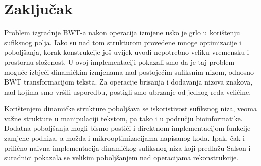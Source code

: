 \documentclass{ferseminar}
\begin{document}
\section{Zaključak}
Problem izgradnje BWT-a nakon operacija izmjene usko je grlo u korištenju sufiksnog polja. Iako su nad tom strukturom provedene mnoge optimizacije i poboljšanja, korak konstrukcije još uvijek uvodi nepotrebno veliku vremensku i prostornu složenost. U ovoj implementaciji pokazali smo da je taj problem moguće izbjeći dinamičkim izmjenama nad postojećim sufiksnim nizom, odnosno BWT transformacijom teksta. Za operacije brisanja i dodavanja nizova znakova, nad kojima smo vršili usporedbu, postigli smo ubrzanje od jednog reda veličine.

Korištenjem dinamičke strukture poboljšava se iskoristivost sufiksnog niza, veoma važne strukture u manipulaciji tekstom, pa tako i u području bioinformatike. Dodatna poboljšanja mogli bismo postići i direktnom implementacijom funkcije zamjene podniza, a možda i mikrooptimizacijama napisanog koda. Ipak, čak i prilično naivna implementacija dinamičkog sufiksnog niza koji predlažu Salson i suradnici pokazala se velikim poboljšanjem nad operacijama rekonstrukcije.

\end{document}
